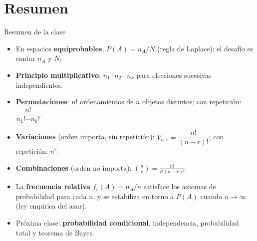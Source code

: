 \documentclass[aspectratio=169,11pt]{beamer}
\begin{document}
\section{Resumen}

\begin{frame}{Resumen de la clase}
\begin{itemize}
\item En espacios \textbf{equiprobables}, $P(A) = n_A/N$ (regla de Laplace); el desafío es contar $n_A$ y $N$.
\item \textbf{Principio multiplicativo}: $n_1\cdot n_2 \cdots n_k$ para elecciones sucesivas independientes.
\item \textbf{Permutaciones}: $n!$ ordenamientos de $n$ objetos distintos; con repetición: $\dfrac{n!}{n_1!\cdots n_k!}$.
\item \textbf{Variaciones} (orden importa, sin repetición): $V_{n,r}=\dfrac{n!}{(n-r)!}$; con repetición: $n^r$.
\item \textbf{Combinaciones} (orden no importa): $\displaystyle\binom{n}{r}=\frac{n!}{r!(n-r)!}$.
\item La \textbf{frecuencia relativa} $f_r(A)=n_A/n$ satisface los axiomas de probabilidad para cada $n$, y se estabiliza en torno a $P(A)$ cuando $n\to\infty$ (ley empírica del azar).
\item Próxima clase: \textbf{probabilidad condicional}, independencia, probabilidad total y teorema de Bayes.
\end{itemize}
\end{frame}
\end{document}
